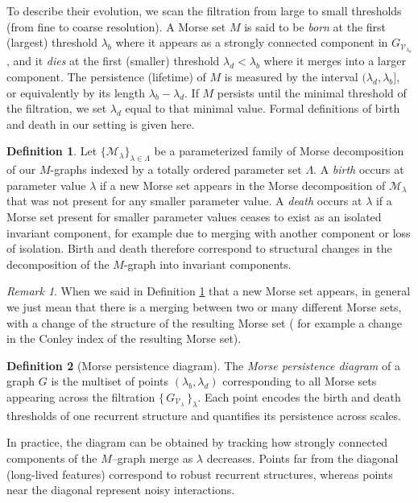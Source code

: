 \documentclass{article}
\theoremstyle{definition}
\newtheorem{definition}{Definition}
\theoremstyle{plain}
\theoremstyle{remark}
\newtheorem{remark}{Remark}
\newcommand{\1}{\mathbbm{1}}  %
\begin{document}
To describe their evolution, we scan the filtration from large to small
thresholds (from fine to coarse resolution).  
A Morse set $M$ is said to be \emph{born} at the first (largest)
threshold $\lambda_b$ where it appears as a strongly connected component
in $G_{\mathcal V_{\lambda_b}}$, and it \emph{dies} at the first
(smaller) threshold $\lambda_d < \lambda_b$ where it merges into a
larger component.  
The persistence (lifetime) of $M$ is measured by the interval
$(\lambda_d,\lambda_b]$, or equivalently by its length
$\lambda_b - \lambda_d$.  
If $M$ persists until the minimal threshold of the filtration, we set
$\lambda_d$ equal to that minimal value. Formal definitions of birth and death in our setting is given here.
\begin{definition}\label{birth-death}
    Let $\{\mathcal{M}_\lambda\}_{\lambda \in \Lambda}$ be a parameterized family
of Morse decomposition of our $M$-graphs indexed by a totally ordered parameter set $\Lambda$.
A \emph{birth} occurs at parameter value $\lambda$ if a new Morse set
appears in the Morse decomposition of $\mathcal{M}_\lambda$ that was not
present for any smaller parameter value.
A \emph{death} occurs at $\lambda$ if a Morse set present for smaller
parameter values ceases to exist as an isolated invariant component,
for example due to merging with another component or loss of isolation.
Birth and death therefore correspond to structural changes in the
decomposition of the $M$-graph into invariant components.
\end{definition}
\begin{remark}
    When we said in Definition \ref{birth-death} that a new Morse set appears, in general we just mean that there is a merging between two  or many different Morse sets, with a change of the structure of the resulting Morse set ( for example a change in the Conley index of the resulting Morse set).
\end{remark}

\begin{definition}[Morse persistence diagram]
The \emph{Morse persistence diagram} of a graph $G$ is the multiset of
points $(\lambda_b,\lambda_d )$
corresponding to all Morse sets appearing across the filtration
$\{\,G_{\mathcal V_\lambda}\,\}_\lambda$.  
Each point encodes the birth and death thresholds of one recurrent
structure and quantifies its persistence across scales.
\end{definition}

In practice, the diagram can be obtained by tracking how strongly
connected components of the $M$--graph merge as $\lambda$ decreases.
Points far from the diagonal (long-lived features) correspond to robust
recurrent structures, whereas points near the diagonal represent noisy interactions.
\end{document}
